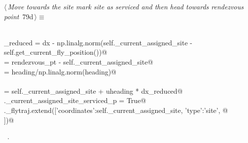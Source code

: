 \documentclass[11.5pt]{report}
\begin{document}
\vspace{-0.8cm} \newchunk {}
\begin{flushleft} \small
\begin{minipage}{\linewidth}\label{scrap123}\raggedright\small
{} $\langle\,${\itshape Move towards the site mark site as serviced and then head towards rendezvous point}\nobreak\ {\footnotesize {79d}}$\,\rangle\equiv$
\vspace{-1ex}
\begin{list}{}{} \item
\mbox{}\verb@@\\
\mbox{}\verb@dx_reduced = dx - np.linalg.norm(self._current_assigned_site -\@\\
\mbox{}\verb@                                 self.get_current_fly_position())@\\
\mbox{}\verb@heading  = rendezvous_pt - self._current_assigned_site@\\
\mbox{}\verb@uheading = heading/np.linalg.norm(heading)@\\
\mbox{}\verb@@\\
\mbox{}\verb@newpt = self._current_assigned_site + uheading * dx_reduced@\\
\mbox{}\verb@self._current_assigned_site_serviced_p = True@\\
\mbox{}\verb@self._flytraj.extend([{'coordinates':self._current_assigned_site, 'type':'site'}, @\\
\mbox{}])@\\
\mbox{}\verb@@{\NWsep}
\end{list}
\vspace{-1.5ex}
\footnotesize
\begin{list}{}{\setlength{\itemsep}{-\parsep}\setlength{\itemindent}{-\leftmargin}}
\item \NWtxtMacroRefIn\ .

\item{}
\end{list}
\end{minipage}\vspace{4ex}
\end{flushleft}
\end{document}
